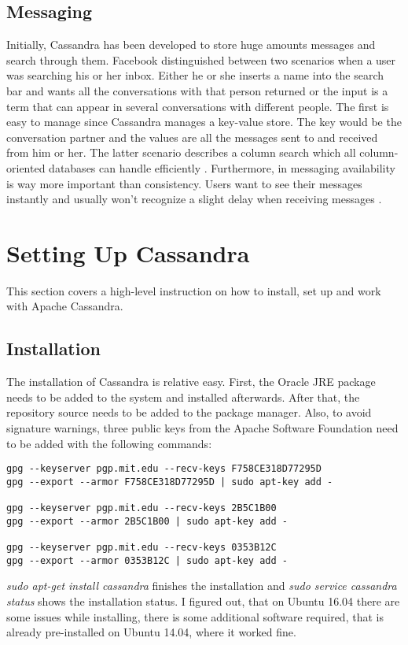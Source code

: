\subsection{Messaging}
Initially, Cassandra has been developed to store huge amounts messages and search through them. Facebook distinguished between two scenarios when a user was searching his or her inbox. Either he or she inserts a name into the search bar and wants all the conversations with that person returned or the input is a term that can appear in several conversations with different people. The first is easy to manage since Cassandra manages a key-value store. The key would be the conversation partner and the values are all the messages sent to and received from him or her. The latter scenario describes a column search which all column-oriented databases can handle efficiently \cite{useCases} \cite{useCases2}.
Furthermore, in messaging availability is way more important than consistency. Users want to see their messages instantly and usually won't recognize a slight delay when receiving messages \cite{useCases}.

\clearpage
\section{Setting Up Cassandra}
This section covers a high-level instruction on how to install, set up and work with Apache Cassandra.

\subsection{Installation}
The installation of Cassandra is relative easy. First, the Oracle JRE package needs to be added to the system and installed afterwards. After that, the repository source needs to be added to the package manager.
Also, to avoid signature warnings, three public keys from the Apache Software Foundation need to be added with the following commands:

  \begin{lstlisting}
gpg --keyserver pgp.mit.edu --recv-keys F758CE318D77295D
gpg --export --armor F758CE318D77295D | sudo apt-key add -

gpg --keyserver pgp.mit.edu --recv-keys 2B5C1B00
gpg --export --armor 2B5C1B00 | sudo apt-key add -

gpg --keyserver pgp.mit.edu --recv-keys 0353B12C
gpg --export --armor 0353B12C | sudo apt-key add -
  \end{lstlisting}
\textit{sudo apt-get install cassandra} finishes the installation and \textit{sudo service cassandra status} shows the installation status. I figured out, that on Ubuntu 16.04 there are some issues while installing, there is some additional software required, that is already pre-installed on Ubuntu 14.04, where it worked fine.

